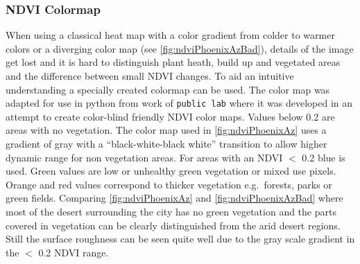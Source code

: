\subsubsection{NDVI Colormap}\label{sec:colormap}
When using a classical heat map with a color gradient from colder to warmer colors or a diverging color map (see \cref{fig:ndviPhoenixAzBad}), details of the image get lost and it is hard to distinguish plant heath, build up and vegetated areas and the difference between small \ac{NDVI} changes.
To aid an intuitive understanding a specially created colormap can be used. 
The color map was adapted for use in python from work of \texttt{public lab}\cite{ndviCmap} where it was developed in an attempt to create color-blind friendly \ac{NDVI} color maps.
Values below 0.2 are areas with no vegetation.
The color map used in \cref{fig:ndviPhoenixAz} uses a gradient of gray with a ``black-white-black
white'' transition to allow higher dynamic range for non vegetation areas.
For areas with an \ac{NDVI} $<$ 0.2 blue is used. Green values are low or unhealthy green vegetation or mixed use pixels. 
Orange and red values correspond to thicker vegetation e.g.~forests, parks or green fields. 
%
Comparing \cref{fig:ndviPhoenixAz}  and \cref{fig:ndviPhoenixAzBad} where most of the desert surrounding the city has no green vegetation and the parts covered in vegetation can be clearly distinguished from the arid desert regions.
Still the surface roughness can be seen quite well due to the gray scale gradient in the $<$ 0.2 \ac{NDVI} range.  
%
